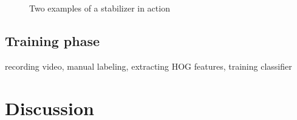 \begin{figure}[htbp]
  \centering
{}
\hspace{0.03\linewidth}
  \caption{Two examples of a stabilizer in action}
  \label{fig:stabilizer}
\end{figure}




\subsection*{Training phase}
recording video, manual labeling, extracting HOG features, training classifier

\section{Discussion}
